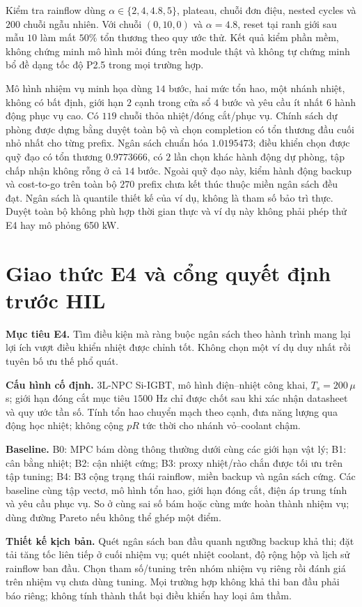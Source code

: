 \documentclass[11pt,a4paper]{article}
\begin{document}
Kiểm tra rainflow dùng $\alpha\in\{2,4,4.8,5\}$, plateau, chuỗi đơn điệu, nested cycles và $200$ chuỗi ngẫu nhiên. Với chuỗi $(0,10,0)$ và $\alpha=4.8$, reset tại ranh giới sau mẫu $10$ làm mất $50\%$ tổn thương theo quy ước thử. Kết quả kiểm phần mềm, không chứng minh mô hình mỏi đúng trên module thật và không tự chứng minh bổ đề dạng tốc độ P2.5 trong mọi trường hợp.

Mô hình nhiệm vụ minh họa dùng $14$ bước, hai mức tổn hao, một nhánh nhiệt, không có bất định, giới hạn $2$ cạnh trong cửa sổ $4$ bước và yêu cầu ít nhất $6$ hành động phục vụ cao. Có $119$ chuỗi thỏa nhiệt/đóng cắt/phục vụ. Chính sách dự phòng được dựng bằng duyệt toàn bộ và chọn completion có tổn thương đầu cuối nhỏ nhất cho từng prefix. Ngân sách chuẩn hóa $1.0195473$; điều khiển chọn được quỹ đạo có tổn thương $0.9773666$, có $2$ lần chọn khác hành động dự phòng, tập chấp nhận không rỗng ở cả $14$ bước. Ngoài quỹ đạo này, kiểm hành động backup và cost-to-go trên toàn bộ $270$ prefix chưa kết thúc thuộc miền ngân sách đều đạt. Ngân sách là quantile thiết kế của ví dụ, không là tham số bảo trì thực. Duyệt toàn bộ không phù hợp thời gian thực và ví dụ này không phải phép thử E4 hay mô phỏng 650 kW.

\section{Giao thức E4 và cổng quyết định trước HIL}
\textbf{Mục tiêu E4.} Tìm điều kiện mà ràng buộc ngân sách theo hành trình mang lại lợi ích vượt điều khiển nhiệt được chỉnh tốt. Không chọn một ví dụ duy nhất rồi tuyên bố ưu thế phổ quát.

\textbf{Cấu hình cố định.} 3L-NPC Si-IGBT, mô hình điện--nhiệt công khai, $T_s=200\,\mu$s; giới hạn đóng cắt mục tiêu $1500$ Hz chỉ được chốt sau khi xác nhận datasheet và quy ước tần số. Tính tổn hao chuyển mạch theo cạnh, đưa năng lượng qua động học nhiệt; không cộng $pR$ tức thời cho nhánh vỏ--coolant chậm.

\textbf{Baseline.} B0: MPC bám dòng thông thường dưới cùng các giới hạn vật lý; B1: cân bằng nhiệt; B2: cận nhiệt cứng; B3: proxy nhiệt/rào chắn được tối ưu trên tập tuning; B4: B3 cộng trạng thái rainflow, miền backup và ngân sách cứng. Các baseline cùng tập vectơ, mô hình tổn hao, giới hạn đóng cắt, điện áp trung tính và yêu cầu phục vụ. So ở cùng sai số bám hoặc cùng mức hoàn thành nhiệm vụ; dùng đường Pareto nếu không thể ghép một điểm.

\textbf{Thiết kế kịch bản.} Quét ngân sách ban đầu quanh ngưỡng backup khả thi; đặt tải tăng tốc liên tiếp ở cuối nhiệm vụ; quét nhiệt coolant, độ rộng hộp và lịch sử rainflow ban đầu. Chọn tham số/tuning trên nhóm nhiệm vụ riêng rồi đánh giá trên nhiệm vụ chưa dùng tuning. Mọi trường hợp không khả thi ban đầu phải báo riêng; không tính thành thất bại điều khiển hay loại âm thầm.
\end{document}
